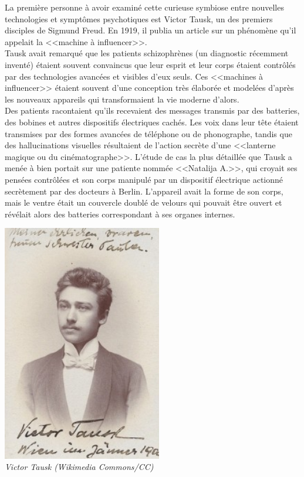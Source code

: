 \documentclass[11pt,twoside,a4paper]{article}
\begin{document}
\begin{minipage}[ht]{0.65\textwidth}
	La premi{\`e}re personne {\`a} avoir examin{\'e} cette curieuse symbiose entre nouvelles technologies et sympt{\^o}mes psychotiques est Victor Tausk, un des premiers disciples de Sigmund Freud. En 1919, il publia un article sur un ph{\'e}nom{\`e}ne qu'il appelait la <<machine {\`a} influencer>>.~\\

	Tausk avait remarqu{\'e} que les patients schizophr{\`e}nes (un diagnostic r{\'e}cemment invent{\'e}) {\'e}taient souvent convaincus que leur esprit et leur corps {\'e}taient contr{\^o}l{\'e}s par des technologies avanc{\'e}es et visibles d'eux seuls. Ces <<machines {\`a} influencer>> {\'e}taient souvent d'une conception tr{\`e}s {\'e}labor{\'e}e et model{\'e}es d'apr{\`e}s les nouveaux appareils qui transformaient la vie moderne d'alors.~\\
	
	Des patients racontaient qu'ils recevaient des messages transmis par des batteries, des bobines et autres dispositifs {\'e}lectriques cach{\'e}s. Les voix dans leur t{\^e}te {\'e}taient transmises par des formes avanc{\'e}es de t{\'e}l{\'e}phone ou de phonographe, tandis que des hallucinations visuelles r{\'e}sultaient de l'action secr{\`e}te d'une <<lanterne magique ou du cin{\'e}matographe>>. L'{\'e}tude de cas la plus d{\'e}taill{\'e}e que Tausk a men{\'e}e {\`a} bien portait sur une patiente nomm{\'e}e <<Natalija A.>>, qui croyait ses pens{\'e}es contr{\^o}l{\'e}es et son corps manipul{\'e} par un dispositif {\'e}lectrique actionn{\'e} secr{\`e}tement par des docteurs {\`a} Berlin. L'appareil avait la forme de son corps, mais le ventre {\'e}tait un couvercle doubl{\'e} de velours qui pouvait {\^e}tre ouvert et r{\'e}v{\'e}lait alors des batteries correspondant {\`a} ses organes internes.~\\
\end{minipage} \hfill \begin{minipage}[ht]{7.00cm}
	\includegraphics[width=6.95cm]{img/ulyces-trumanshow-03.jpg}~\\
	\emph{\footnotesize Victor Tausk (Wikimedia Commons/CC) }
\end{minipage}~\\
\end{document}
